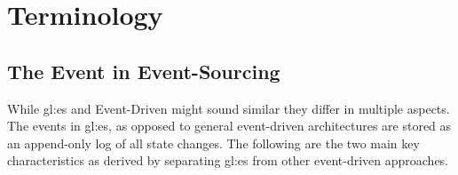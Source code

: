 


\section{Terminology}\label{sec:term}

\subsection{The Event in Event-Sourcing}

While \gls{gl:es} and Event-Driven might sound similar they differ in multiple aspects. The events in \gls{gl:es}, as opposed to general event-driven architectures are stored as an append-only log of all state changes. The following are the two main key characteristics as derived by \citep{esvsed} separating \gls{gl:es} from other event-driven approaches.

